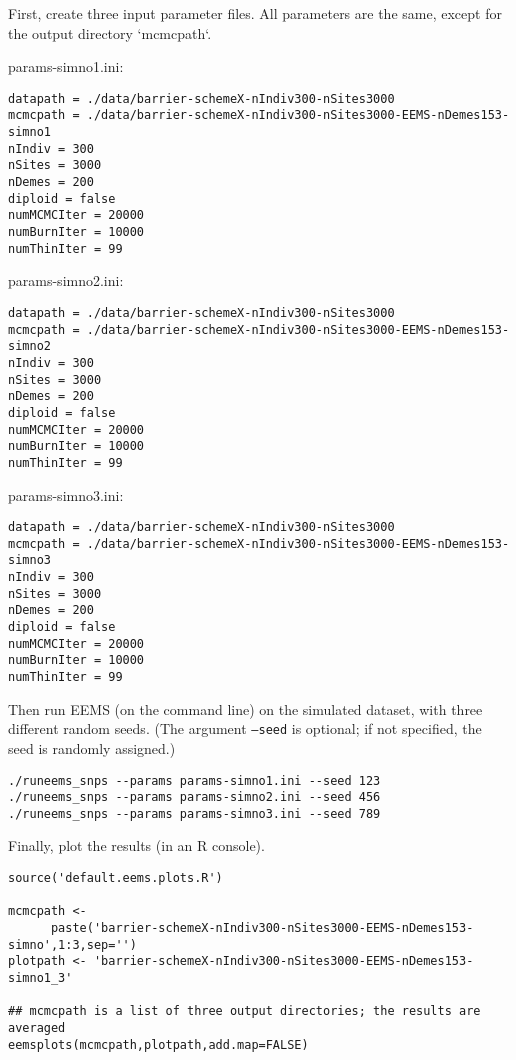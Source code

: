 \documentclass[a4paper,10pt,DIV=15,mpinclude=true]{scrartcl}
\begin{document}
First, create three input parameter files. All parameters are the same, except for the output directory `mcmcpath`.

\bigskip

\noindent params-simno1.ini:
\begin{verbatim}
datapath = ./data/barrier-schemeX-nIndiv300-nSites3000
mcmcpath = ./data/barrier-schemeX-nIndiv300-nSites3000-EEMS-nDemes153-simno1
nIndiv = 300
nSites = 3000
nDemes = 200
diploid = false
numMCMCIter = 20000
numBurnIter = 10000
numThinIter = 99
\end{verbatim}

\noindent params-simno2.ini:
\begin{verbatim}
datapath = ./data/barrier-schemeX-nIndiv300-nSites3000
mcmcpath = ./data/barrier-schemeX-nIndiv300-nSites3000-EEMS-nDemes153-simno2
nIndiv = 300
nSites = 3000
nDemes = 200
diploid = false
numMCMCIter = 20000
numBurnIter = 10000
numThinIter = 99
\end{verbatim}

\noindent params-simno3.ini:
\begin{verbatim}
datapath = ./data/barrier-schemeX-nIndiv300-nSites3000
mcmcpath = ./data/barrier-schemeX-nIndiv300-nSites3000-EEMS-nDemes153-simno3
nIndiv = 300
nSites = 3000
nDemes = 200
diploid = false
numMCMCIter = 20000
numBurnIter = 10000
numThinIter = 99
\end{verbatim}

Then run EEMS (on the command line) on the simulated dataset, with three different random seeds. (The argument {\tt --seed} is optional; if not specified, the seed is randomly assigned.)

\begin{verbatim}
./runeems_snps --params params-simno1.ini --seed 123
./runeems_snps --params params-simno2.ini --seed 456
./runeems_snps --params params-simno3.ini --seed 789
\end{verbatim}

Finally, plot the results (in an R console).

\begin{verbatim}
source('default.eems.plots.R')

mcmcpath <- 
      paste('barrier-schemeX-nIndiv300-nSites3000-EEMS-nDemes153-simno',1:3,sep='')
plotpath <- 'barrier-schemeX-nIndiv300-nSites3000-EEMS-nDemes153-simno1_3'

## mcmcpath is a list of three output directories; the results are averaged                                                                                
eemsplots(mcmcpath,plotpath,add.map=FALSE)
\end{verbatim}
\end{document}
